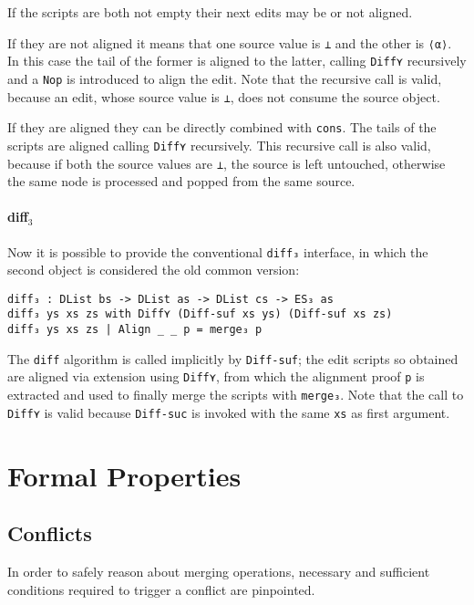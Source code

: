 \documentclass[../Thesis.tex]{subfiles}
\begin{document}
	If the scripts are both not empty their next edits may be or not
	aligned. 
	
	If they are not aligned it means that one source
	value is \texttt{⊥} and the other is \texttt{⟨α⟩}. In this case
	the tail of the former is aligned to the latter, calling \texttt{Diff⋎} 
	recursively and a \texttt{Nop} is introduced to align the edit.
	Note that the recursive call is valid, because an edit, whose
	source value is \texttt{⊥}, does not consume the source object.

	If they are aligned they can be directly combined with \texttt{cons}.
	The tails of the scripts are aligned calling \texttt{Diff⋎} recursively.
	This recursive call is also valid, because if both the source values are
	\texttt{⊥}, the source is left untouched, otherwise the same node
	is processed and popped from the same source.	

	\paragraph{diff$_3$}
	Now it is possible to provide the conventional \texttt{diff₃} interface, in
	which the second object is considered the old common version:
\begin{verbatim}
diff₃ : DList bs -> DList as -> DList cs -> ES₃ as
diff₃ ys xs zs with Diff⋎ (Diff-suf xs ys) (Diff-suf xs zs)
diff₃ ys xs zs | Align _ _ p = merge₃ p
\end{verbatim}
	
	The \texttt{diff} algorithm is called implicitly by \texttt{Diff-suf}; the
	edit scripts so obtained are aligned via extension using 
	\texttt{Diff⋎}, from which the alignment proof \texttt{p} is extracted
	and used to finally merge the scripts with \texttt{merge₃}.
	Note that the call to \texttt{Diff⋎} is valid because \texttt{Diff-suc}
	is invoked with the same \texttt{xs} as first argument.
	
		
	
\section{Formal Properties}

	\subsection{Conflicts}
		In order to safely reason about merging operations, necessary and 	
		sufficient conditions required to trigger a conflict are pinpointed.
		
\end{document}
